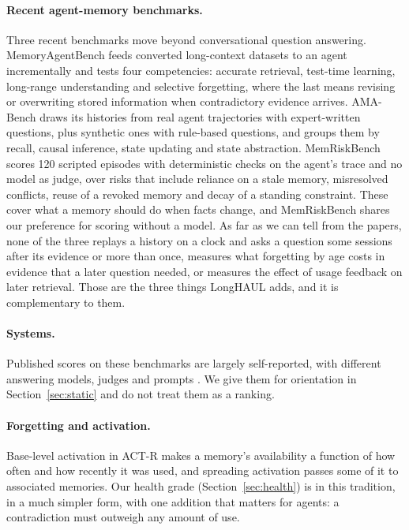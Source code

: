 \documentclass[11pt]{article}
\begin{document}
\paragraph{Recent agent-memory benchmarks.} Three recent benchmarks
move beyond conversational question answering. MemoryAgentBench
\citep{hu2025memoryagentbench} feeds converted long-context datasets
to an agent incrementally and tests four competencies: accurate
retrieval, test-time learning, long-range understanding and selective
forgetting, where the last means revising or overwriting stored
information when contradictory evidence arrives. AMA-Bench
\citep{zhao2026amabench} draws its histories from real agent
trajectories with expert-written questions, plus synthetic ones with
rule-based questions, and groups them by recall, causal inference,
state updating and state abstraction. MemRiskBench
\citep{jiang2026memriskbench} scores 120 scripted episodes with
deterministic checks on the agent's trace and no model as judge, over
risks that include reliance on a stale memory, misresolved conflicts,
reuse of a revoked memory and decay of a standing constraint. These
cover what a memory should do when facts change, and MemRiskBench
shares our preference for scoring without a model. As far as we can
tell from the papers, none of the three replays a history on a clock
and asks a question some sessions after its evidence or more than
once, measures what forgetting by age costs in evidence that a later
question needed, or measures the effect of usage feedback on later
retrieval. Those are the three things LongHAUL adds, and it is
complementary to them.

\paragraph{Systems.} Published scores on these benchmarks are largely
self-reported, with different answering models, judges and prompts
\citep{chhikara2025mem0,rasmussen2025zep,hindsight2025,mastra2026om}.
We give them for orientation in Section~\ref{sec:static} and do not
treat them as a ranking.

\paragraph{Forgetting and activation.} Base-level activation in ACT-R
\citep{anderson2004actr} makes a memory's availability a function of
how often and how recently it was used, and spreading activation passes
some of it to associated memories. Our health grade
(Section~\ref{sec:health}) is in this tradition, in a much simpler
form, with one addition that matters for agents: a contradiction must
outweigh any amount of use.
\end{document}
